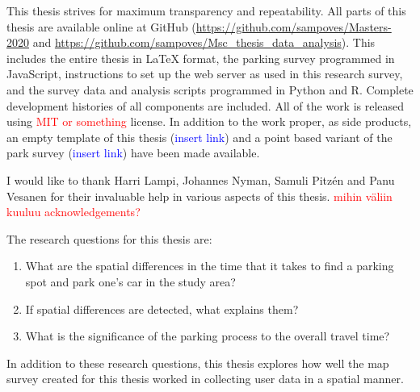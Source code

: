 This thesis strives for maximum transparency and repeatability. All parts of this thesis are available online at GitHub (\textcolor{blue}{\url{https://github.com/sampoves/Masters-2020}} and \textcolor{blue}{\url{https://github.com/sampoves/Msc_thesis_data_analysis}}). This includes the entire thesis in LaTeX format, the parking survey programmed in JavaScript, instructions to set up the web server as used in this research survey, and the survey data and analysis scripts programmed in Python and R. Complete development histories of all components are included. All of the work is released using \textcolor{red}{MIT or something} license. In addition to the work proper, as side products, an empty template of this thesis (\textcolor{blue}{insert link}) and a point based variant of the park survey (\textcolor{blue}{insert link}) have been made available.

I would like to thank Harri Lampi, Johannes Nyman, Samuli Pitzén and Panu Vesanen for their invaluable help in various aspects of this thesis. \textcolor{red}{mihin väliin kuuluu acknowledgements?}

\bigskip
\noindent
The research questions for this thesis are:

\begin{spacing}{1}
    \begin{enumerate}[label=\Roman*]
      \item What are the spatial differences in the time that it takes to find a parking spot and park one’s car in the study area?
      \item If spatial differences are detected, what explains them?
      \item What is the significance of the parking process to the overall travel time?
    \end{enumerate}
\end{spacing}
\bigskip
In addition to these research questions, this thesis explores how well the map survey created for this thesis worked in collecting user data in a spatial manner.